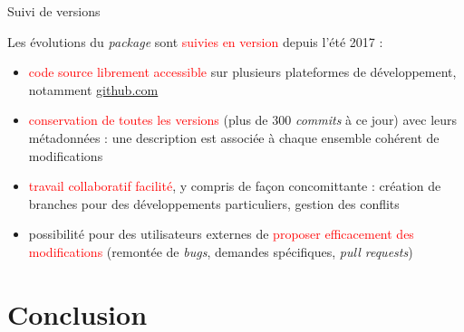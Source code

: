 \documentclass[xcolor=dvipsnames]{beamer}
\begin{document}
\begin{frame}{Suivi de versions}

Les évolutions du \textit{package} sont \textcolor{red}{suivies en version} depuis l'été 2017 :

\begin{itemize}
    \vspace{0.1 cm}
    \item \textcolor{red}{code source librement accessible} sur plusieurs plateformes de développement, notamment \underline{\href{https://github.com/martinchevalier/gustave}{github.com}}

    \vspace{0.1 cm}

    \item \textcolor{red}{conservation de toutes les versions} (plus de 300 \textit{commits} à ce jour) avec leurs métadonnées : une description est associée à chaque ensemble cohérent de modifications

    \vspace{0.1 cm}

    \item \textcolor{red}{travail collaboratif facilité}, y compris de façon concomittante : création de branches pour des développements particuliers, gestion des conflits

    \vspace{0.1 cm}

    \item possibilité pour des utilisateurs externes de \textcolor{red}{proposer efficacement des modifications} (remontée de \textit{bugs}, demandes spécifiques, \textit{pull requests})
\end{itemize}
    
\end{frame}

\section*{Conclusion}
\end{document}
